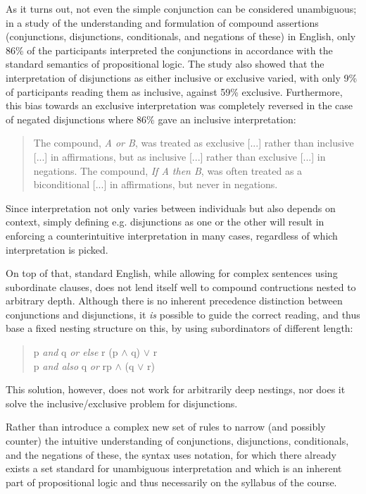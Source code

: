 \documentclass[manual.tex]{subfiles}
\begin{document}
 As it turns out, not even the simple conjunction can be considered 
 unambiguous; in a study\cite{negation} of the understanding and
 formulation of compound assertions (conjunctions, disjunctions, 
 conditionals, and negations of these) in English, only 86\% of the
 participants interpreted the conjunctions in accordance with the
 standard semantics of propositional logic\cite[p.~4]{negation}.
 The study also
 showed that the interpretation of disjunctions as either
 inclusive or exclusive varied, with only 9\% of participants reading
 them as inclusive, against 59\% exclusive\cite[\emph{ibid.}]{negation}.
 Furthermore, this bias towards an exclusive interpretation was completely
 reversed in the case of negated disjunctions where 86\% gave an inclusive
 interpretation:
 \begin{quote}
 The compound, \emph{A or B},
 was treated as exclusive [...] rather than inclusive [...]
 in affirmations, but as inclusive [...] rather than exclusive [...] 
 in negations. The compound, \emph{If A then B}, was
 often treated as a biconditional [...] in affirmations, but
 never in negations.\cite[p.~5]{negation}
 \end{quote}
 Since interpretation not only varies between individuals but also 
 depends on context, simply defining e.g. disjunctions as one or the other
 will result in enforcing a counterintuitive interpretation in many cases,
 regardless of which interpretation is picked.
 
 On top of that, standard English, while allowing for
 complex sentences using subordinate clauses, does not lend itself well to
 compound contructions nested to arbitrary depth. Although there is no 
 inherent precedence distinction between conjunctions and disjunctions, it
 \emph{is} possible to guide the correct reading, and thus base a fixed
 nesting structure on this, by using 
 subordinators of different length:
 \begin{quote}
 \ttfamily
    p \emph{and} q \emph{or else} r \hfill (p \(\land\) q) \(\lor\) r~ \\
    p \emph{and also} q \emph{or} r\hfill p \(\land\) (q \(\lor\) r)
 \end{quote}
 This solution, however, does not work for arbitrarily deep nestings, nor
 does it solve the inclusive/exclusive problem for disjunctions.

 Rather than introduce a complex new set of rules to narrow (and possibly
 counter) the intuitive understanding of conjunctions, disjunctions,
 conditionals, and the negations of these, the syntax uses
  notation, for which there already exists a set standard
 for unambiguous interpretation and which is an inherent part of
 propositional logic and thus necessarily on the syllabus of the course.
\end{document}
